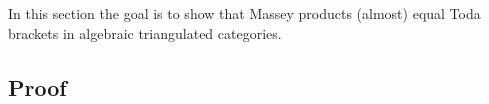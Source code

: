 In this section the goal is to show that Massey products (almost) equal Toda brackets in algebraic triangulated categories.

\subsection{Proof}
